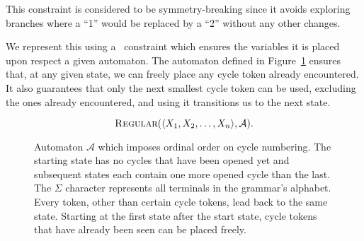 \documentclass[../Document.tex]{subfiles}
\begin{document}
This constraint is considered to be symmetry-breaking since it avoids exploring branches where a ``1'' would be replaced by a ``2'' without any other changes.

We represent this using a \regular\ constraint which ensures the variables it is placed upon respect a given automaton. The automaton defined in Figure~\ref{fig:cycleCountingAutomaton} ensures that, at any given state, we can freely place any cycle token already encountered. It also guarantees that only the next smallest cycle token can be used, excluding the ones already encountered, and using it transitions us to the next state.

$$\mbox{\sc Regular}(\langle X_1, X_2, \ldots, X_n \rangle, \mathcal{A}).$$

\begin{figure}[ht]
    \centering
    \caption[Automaton $\mathcal{A}$ which imposes ordinal order on cycle numbering.]{Automaton $\mathcal{A}$ which imposes ordinal order on cycle numbering. The starting state has no cycles that have been opened yet and subsequent states each contain one more opened cycle than the last. The $\Sigma$ character represents all terminals in the grammar's alphabet. Every token, other than certain cycle tokens, lead back to the same state. Starting at the first state after the start state, cycle tokens that have already been seen can be placed freely.}
    \label{fig:cycleCountingAutomaton}
\end{figure}
\end{document}
